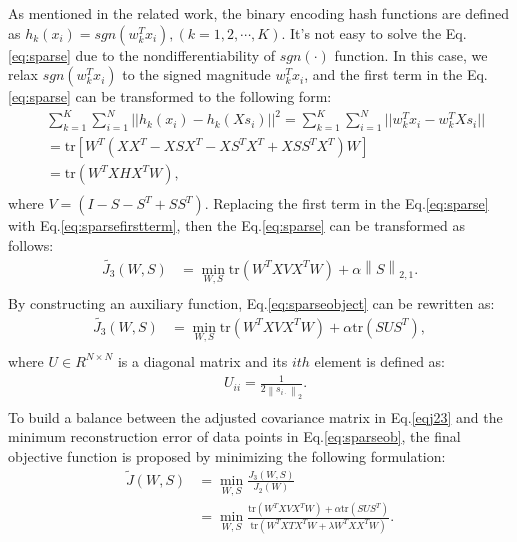 \documentclass{sig-alternate}
\begin{document}
As mentioned in the related work, the binary encoding hash functions are defined as $h_k(x_i)=sgn(w_k^Tx_i),(k=1, 2, \cdots, K)$. It's not easy to solve the Eq.\ref{eq:sparse} due to the nondifferentiability of $sgn(\cdot)$ function. In this case, we relax $sgn(w_k^Tx_i)$ to the signed magnitude $w_k^Tx_i$, and the first term in the Eq.\ref{eq:sparse} can be transformed to the following form:
\begin{equation}\label{eq:sparsefirstterm}
    \begin{split}
& \sum_{k=1}^{K} \sum_{i=1}^{N}||h_k(x_i)-h_k(Xs_i)||^2 = \sum_{k=1}^{K} \sum_{i=1}^{N}||w_k^Tx_i-w_k^TXs_i||\\
& = \mathrm{tr}\left[W^T(XX^T-XSX^T-XS^TX^T+XSS^TX^T)W\right]\\
& = \mathrm{tr}\left(W^TXHX^TW\right),\\
    \end{split}
\end{equation}
where $V=(I-S-S^T+SS^T)$. Replacing the first term in the Eq.\ref{eq:sparse} with Eq.\ref{eq:sparsefirstterm}, then the Eq.\ref{eq:sparse} can be transformed as follows:
 \begin{equation}\label{eq:sparseobject}
    \begin{split}
    \tilde{J_3}(W,S) & =\min_{W, S} \mathrm{tr}\left(W^TXVX^TW\right)+\alpha\left \| S\right \|_{2,1}.\\
    \end{split}
\end{equation}
By constructing an auxiliary function, Eq.\ref{eq:sparseobject} can be rewritten as:
 \begin{equation}\label{eq:sparseob}
    \begin{split}
    \tilde{J_3}(W, S) & =\min_{W,S} \mathrm{tr}\left(W^TXVX^TW\right)+\alpha \mathrm{tr}\left(SUS^T\right),\\
    \end{split}
\end{equation}
where $U \in R^{N \times N}$ is a diagonal matrix and its $ith$ element is defined as:
 \begin{equation}\label{diaU}
    \begin{split}
& U_{ii}=\frac{1}{2\left \| s_{i\cdot}\right \|_2}.\\
    \end{split}
\end{equation}
To build a balance between the adjusted covariance matrix in Eq.\ref{eqj23} and the minimum reconstruction error of data points in Eq.\ref{eq:sparseob}, the final objective function is proposed by minimizing the following formulation:
 \begin{equation}\label{total}
    \begin{split}
    \tilde{J}(W, S) & =\min_{W,S} \frac{{J_3}(W,S)}{{J_2}(W)}\\
& =\min_{W,S} \frac{\mathrm{tr}\left(W^TXVX^TW\right)+\alpha\mathrm{tr}\left(SUS^T\right)}{\mathrm{tr}(W^TXTX^TW+\lambda W^TXX^TW)}.\\
    \end{split}
\end{equation}
\end{document}
